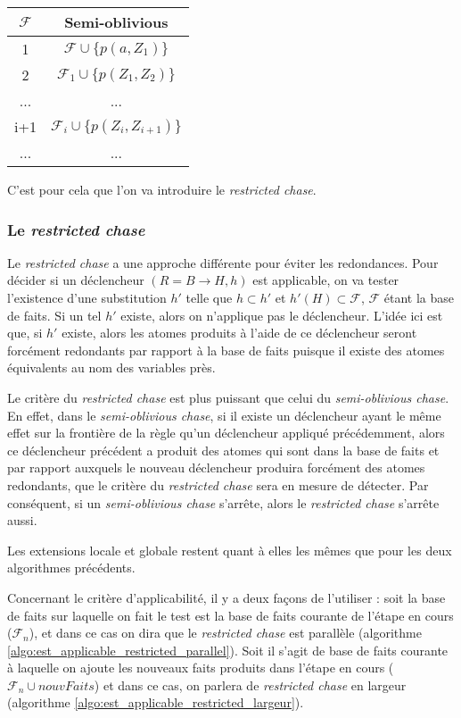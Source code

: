 \begin{center}
\begin{tabular}{|c|c|}
    \hline
    $\mathcal{F}$ & Semi-oblivious \\ 
    \hline
    1  & $\mathcal{F} \cup \{p(a, Z_1)\} $ \\ 
    \hline
    2  &$\mathcal{F}_1 \cup \{p(Z_1, Z_2)\}$  \\
    \hline
    ...  & ...  \\
    \hline
    i+1 & $\mathcal{F}_i \cup \{p(Z_{i}, Z_{i+1})\} $   \\
     \hline
     ...  & ...  \\
     \hline
\end{tabular}
\end{center}
C'est pour cela que l'on va introduire le \textit{restricted chase}.

\subsubsection{Le \textit{restricted chase}}\label{sec:restricted_chase}

Le \textit{restricted chase} a une approche différente pour éviter les redondances. Pour décider si un déclencheur $(R = B \rightarrow H,h)$ est applicable, on va tester l'existence d'une substitution $h'$ telle que $h \subset h'$ et $h'(H) \subset \mathcal{F}$, $\mathcal{F}$ étant la base de faits. Si un tel $h'$ existe, alors on n'applique pas le déclencheur. L'idée ici est que, si $h'$ existe, alors les atomes produits à l'aide de ce déclencheur seront forcément redondants par rapport à la base de faits puisque il existe des atomes équivalents au nom des variables près.
\par Le critère du \textit{restricted chase} est plus puissant que celui du \textit{semi-oblivious chase}. En effet, dans le \textit{semi-oblivious chase}, si il existe un déclencheur ayant le même effet sur la frontière de la règle qu'un déclencheur appliqué précédemment, alors ce déclencheur précédent a produit des atomes qui sont dans la base de faits et par rapport auxquels le nouveau déclencheur produira forcément des atomes redondants, que le critère du \textit{restricted chase} sera en mesure de détecter. Par conséquent, si un \textit{semi-oblivious chase} s'arrête, alors le \textit{restricted chase} s'arrête aussi.
\par Les extensions locale et globale restent quant à elles les mêmes que pour les deux algorithmes précédents.
\par Concernant le critère d'applicabilité, il y a deux façons de l'utiliser : soit la base de faits sur laquelle on fait le test est la base de faits courante de l'étape en cours ($\mathcal{F}_n$), et dans ce cas on dira que le \textit{restricted chase} est parallèle (algorithme \ref{algo:est_applicable_restricted_parallel}). Soit il s'agit de base de faits courante à laquelle on ajoute les nouveaux faits produits dans l'étape en cours ($\mathcal{F}_n \cup nouvFaits$) et dans ce cas, on parlera de \textit{restricted chase} en largeur (algorithme \ref{algo:est_applicable_restricted_largeur}).


